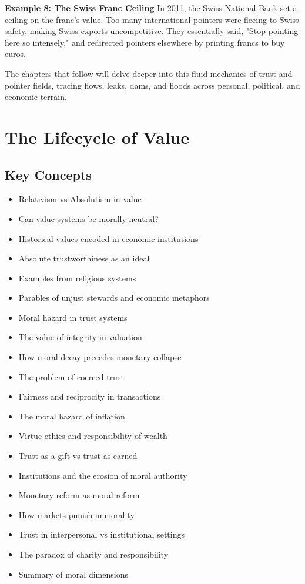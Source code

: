 \documentclass[11pt,oneside]{book}
\begin{document}
\textbf{Example 8: The Swiss Franc Ceiling}
In 2011, the Swiss National Bank set a ceiling on the franc's value. Too many international pointers were fleeing to Swiss safety, making Swiss exports uncompetitive. They essentially said, "Stop pointing here so intensely," and redirected pointers elsewhere by printing francs to buy euros.

The chapters that follow will delve deeper into this fluid mechanics of trust and pointer fields, tracing flows, leaks, dams, and floods across personal, political, and economic terrain.


\chapter{ The Lifecycle of Value}

\section{Key Concepts}

\begin{itemize}
\item Relativism vs Absolutism in value
\item Can value systems be morally neutral?
\item Historical values encoded in economic institutions
\item Absolute trustworthiness as an ideal
\item Examples from religious systems
\item Parables of unjust stewards and economic metaphors
\item Moral hazard in trust systems
\item The value of integrity in valuation
\item How moral decay precedes monetary collapse
\item The problem of coerced trust
\item Fairness and reciprocity in transactions
\item The moral hazard of inflation
\item Virtue ethics and responsibility of wealth
\item Trust as a gift vs trust as earned
\item Institutions and the erosion of moral authority
\item Monetary reform as moral reform
\item How markets punish immorality
\item Trust in interpersonal vs institutional settings
\item The paradox of charity and responsibility
\item Summary of moral dimensions
\end{itemize}
\end{document}
